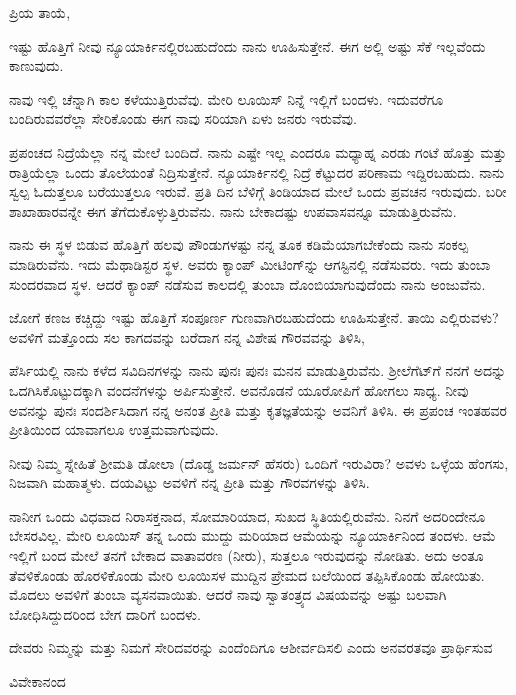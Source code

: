 \noindent
ಪ್ರಿಯ ತಾಯೆ,

ಇಷ್ಟು ಹೊತ್ತಿಗೆ ನೀವು ನ್ಯೂಯಾರ್ಕಿನಲ್ಲಿರಬಹುದೆಂದು ನಾನು ಊಹಿಸುತ್ತೇನೆ. ಈಗ ಅಲ್ಲಿ ಅಷ್ಟು ಸೆಕೆ ಇಲ್ಲವೆಂದು ಕಾಣುವುದು.

ನಾವು ಇಲ್ಲಿ ಚೆನ್ನಾಗಿ ಕಾಲ ಕಳೆಯುತ್ತಿರುವೆವು. ಮೇರಿ ಲೂಯಿಸ್ ನಿನ್ನೆ ಇಲ್ಲಿಗೆ ಬಂದಳು. ಇದುವರೆಗೂ ಬಂದಿರುವವರೆಲ್ಲಾ ಸೇರಿಕೊಂಡು ಈಗ ನಾವು ಸರಿಯಾಗಿ ಏಳು ಜನರು ಇರುವೆವು.

ಪ್ರಪಂಚದ ನಿದ್ರೆಯೆಲ್ಲಾ ನನ್ನ ಮೇಲೆ ಬಂದಿದೆ. ನಾನು ಎಷ್ಟೇ ಇಲ್ಲ ಎಂದರೂ ಮಧ್ಯಾಹ್ನ ಎರಡು ಗಂಟೆ ಹೊತ್ತು ಮತ್ತು ರಾತ್ರಿಯೆಲ್ಲಾ ಒಂದು ತೊಲೆಯಂತೆ ನಿದ್ರಿಸುತ್ತೇನೆ. ನ್ಯೂಯಾರ್ಕಿನಲ್ಲಿ ನಿದ್ರೆ ಕೆಟ್ಟುದರ ಪರಿಣಾಮ ಇದ್ದಿರಬಹುದು. ನಾನು ಸ್ವಲ್ಪ ಓದುತ್ತಲೂ ಬರೆಯುತ್ತಲೂ ಇರುವೆ. ಪ್ರತಿ ದಿನ ಬೆಳಿಗ್ಗೆ ತಿಂಡಿಯಾದ ಮೇಲೆ ಒಂದು ಪ್ರವಚನ ಇರುವುದು. ಬರೀ ಶಾಖಾಹಾರವನ್ನೇ ಈಗ ತೆಗೆದುಕೊಳ್ಳುತ್ತಿರುವೆನು. ನಾನು ಬೇಕಾದಷ್ಟು ಉಪವಾಸವನ್ನೂ ಮಾಡುತ್ತಿರುವೆನು.

ನಾನು ಈ ಸ್ಥಳ ಬಿಡುವ ಹೊತ್ತಿಗೆ ಹಲವು ಪೌಂಡುಗಳಷ್ಟು ನನ್ನ ತೂಕ ಕಡಿಮೆಯಾಗಬೇಕೆಂದು ನಾನು ಸಂಕಲ್ಪ ಮಾಡಿರುವೆನು. ಇದು ಮೆಥಾಡಿಸ್ಟರ ಸ್ಥಳ. ಅವರು ಕ್ಯಾಂಪ್ ಮೀಟಿಂಗ್‌ನ್ನು ಆಗಸ್ಟಿನಲ್ಲಿ ನಡೆಸುವರು. ಇದು ತುಂಬಾ ಸುಂದರವಾದ ಸ್ಥಳ. ಆದರೆ ಕ್ಯಾಂಪ್ ನಡೆಸುವ ಕಾಲದಲ್ಲಿ ತುಂಬಾ ದೊಂಬಿಯಾಗುವುದೆಂದು ನಾನು ಅಂಜುವೆನು.

ಜೋಗೆ ಕಣಜ ಕಚ್ಚಿದ್ದು ಇಷ್ಟು ಹೊತ್ತಿಗೆ ಸಂಪೂರ್ಣ ಗುಣವಾಗಿರಬಹುದೆಂದು ಊಹಿಸುತ್ತೇನೆ. ತಾಯಿ ಎಲ್ಲಿರುವಳು? ಅವಳಿಗೆ ಮತ್ತೊಂದು ಸಲ ಕಾಗದವನ್ನು ಬರೆದಾಗ ನನ್ನ ವಿಶೇಷ ಗೌರವವನ್ನು ತಿಳಿಸಿ,

ಪೆರ್ಸಿಯಲ್ಲಿ ನಾನು ಕಳೆದ ಸವಿದಿನಗಳನ್ನು ನಾನು ಪುನಃ ಪುನಃ ಮನನ ಮಾಡುತ್ತಿರುವೆನು. ಶ‍್ರೀಲೆಗೆಟ್‌ಗೆ ನನಗೆ ಅದನ್ನು ಒದಗಿಸಿಕೊಟ್ಟುದಕ್ಕಾಗಿ ವಂದನೆಗಳನ್ನು ಅರ್ಪಿಸುತ್ತೇನೆ. ಅವನೊಡನೆ ಯೂರೋಪಿಗೆ ಹೋಗಲು ಸಾಧ್ಯ. ನೀವು ಅವನನ್ನು ಪುನಃ ಸಂದರ್ಶಿಸಿದಾಗ ನನ್ನ ಅನಂತ ಪ್ರೀತಿ ಮತ್ತು ಕೃತಜ್ಞತೆಯನ್ನು ಅವನಿಗೆ ತಿಳಿಸಿ. ಈ ಪ್ರಪಂಚ ಇಂತಹವರ ಪ್ರೀತಿಯಿಂದ ಯಾವಾಗಲೂ ಉತ್ತಮವಾಗುವುದು.

ನೀವು ನಿಮ್ಮ ಸ್ನೇಹಿತೆ ಶ‍್ರೀಮತಿ ಡೋಲಾ (ದೊಡ್ಡ ಜರ್ಮನ್ ಹೆಸರು) ಒಂದಿಗೆ ಇರುವಿರಾ? ಅವಳು ಒಳ್ಳೆಯ ಹೆಂಗಸು, ನಿಜವಾಗಿ ಮಹಾತ್ಮಳು. ದಯವಿಟ್ಟು ಅವಳಿಗೆ ನನ್ನ ಪ್ರೀತಿ ಮತ್ತು ಗೌರವಗಳನ್ನು ತಿಳಿಸಿ.

ನಾನೀಗ ಒಂದು ವಿಧವಾದ ನಿರಾಸಕ್ತನಾದ, ಸೋಮಾರಿಯಾದ, ಸುಖದ ಸ್ಥಿತಿಯಲ್ಲಿರುವೆನು. ನಿನಗೆ ಅದರಿಂದೇನೂ ಬೇಸರವಿಲ್ಲ. ಮೇರಿ ಲೂಯಿಸ್ ತನ್ನ ಒಂದು ಮುದ್ದು ಮರಿಯಾದ ಆಮೆಯನ್ನು ನ್ಯೂಯಾರ್ಕಿನಿಂದ ತಂದಳು. ಆಮೆ ಇಲ್ಲಿಗೆ ಬಂದ ಮೇಲೆ ತನಗೆ ಬೇಕಾದ ವಾತಾವರಣ (ನೀರು), ಸುತ್ತಲೂ ಇರುವುದನ್ನು ನೋಡಿತು. ಅದು ಅಂತೂ ತೆವಳಿಕೊಂಡು ಹೊರಳಿಕೊಂಡು ಮೇರಿ ಲೂಯಿಸಳ ಮುದ್ದಿನ ಪ್ರೇಮದ ಬಲೆಯಿಂದ ತಪ್ಪಿಸಿಕೊಂಡು ಹೋಯಿತು. ಮೊದಲು ಅವಳಿಗೆ ತುಂಬಾ ವ್ಯಸನವಾಯಿತು. ಆದರೆ ನಾವು ಸ್ವಾತಂತ್ರ್ಯದ ವಿಷಯವನ್ನು ಅಷ್ಟು ಬಲವಾಗಿ ಬೋಧಿಸಿದ್ದುದರಿಂದ ಬೇಗ ದಾರಿಗೆ ಬಂದಳು.

ದೇವರು ನಿಮ್ಮನ್ನು ಮತ್ತು ನಿಮಗೆ ಸೇರಿದವರನ್ನು ಎಂದೆಂದಿಗೂ ಆಶೀರ್ವದಿಸಲಿ ಎಂದು ಅನವರತವೂ ಪ್ರಾರ್ಥಿಸುವ

\begin{flushright}
ವಿವೇಕಾನಂದ
\end{flushright}

